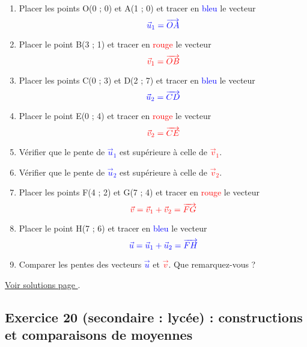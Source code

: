 \begin{enumerate}[label=C\arabic*)]
	\item Placer les points O(0 ; 0) et A(1 ; 0) et tracer en \textcolor{blue}{bleu} le vecteur \[\textcolor{blue}{\vec{u}_1 = \overrightarrow{OA}}\]
	\item Placer le point B(3 ; 1) et tracer en \textcolor{red}{rouge} le vecteur \[\textcolor{red}{\vec{v}_1 = \overrightarrow{OB}}\]
	\item Placer les points C(0 ; 3) et D(2 ; 7) et tracer en \textcolor{blue}{bleu} le vecteur \[\textcolor{blue}{\vec{u}_2 = \overrightarrow{CD}}\]
	\item Placer le point E(0 ; 4) et tracer en \textcolor{red}{rouge} le vecteur \[\textcolor{red}{\vec{v}_2 = \overrightarrow{CE}}\]
	\item Vérifier que le pente de \textcolor{blue}{$\vec{u}_1$} est supérieure à celle de \textcolor{red}{$\vec{v}_1$}.
	\item Vérifier que le pente de \textcolor{blue}{$\vec{u}_2$} est supérieure à celle de \textcolor{red}{$\vec{v}_2$}.
	\item Placer les points F(4 ; 2) et G(7 ; 4) et tracer en \textcolor{red}{rouge} le vecteur \[\textcolor{red}{\vec{v} = \vec{v}_1 + \vec{v}_2 = \overrightarrow{FG}}\]
	\item Placer le point H(7 ; 6) et tracer en \textcolor{blue}{bleu} le vecteur \[\textcolor{blue}{\vec{u} = \vec{u}_1 + \vec{u}_2  = \overrightarrow{FH}}\]
	\item Comparer les pentes des vecteurs \textcolor{blue}{$\vec{u}$} et \textcolor{red}{$\vec{v}$}. Que remarquez-vous ?
\end{enumerate}

\hyperref[sol:niveau19]{Voir solutions page \pageref{sol:niveau19}}.


\newpage


\subsection{Exercice 20 (secondaire : lycée) : constructions et comparaisons de moyennes}

\label{geom:niveau20}

